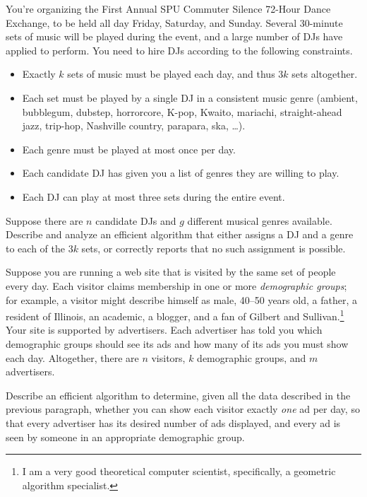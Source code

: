 \begin{exercises}
\item
\label{ex:11.14}
You’re organizing the First Annual SPU Commuter Silence 72-Hour Dance Exchange, to be held all day Friday, Saturday, and Sunday.
Several 30-minute sets of music will be played during the event, and a large number of DJs have applied to perform.
You need to hire DJs according to the following constraints.
\begin{itemize}
\item Exactly $k$ sets of music must be played each day, and thus $3k$ sets altogether.
\item Each set must be played by a single DJ in a consistent music genre (ambient, bubblegum, dubstep, horrorcore, K-pop, Kwaito, mariachi, straight-ahead jazz, trip-hop, Nashville country, parapara, ska, \dots).
\item Each genre must be played at most once per day.
\item Each candidate DJ has given you a list of genres they are willing to play.
\item Each DJ can play at most three sets during the entire event.
\end{itemize}
Suppose there are $n$ candidate DJs and $g$ different musical genres available.
Describe and analyze an efficient algorithm that either assigns a DJ and a genre to each of the $3k$ sets, or correctly reports that no such assignment is possible.

\item
\label{ex:11.15}
Suppose you are running a web site that is visited by the same set of people every day.
Each visitor claims membership in one or more \textit{demographic groups}; for example, a visitor might describe himself as male, 40--50 years old, a father, a resident of Illinois, an academic, a blogger, and a fan of Gilbert and Sullivan.\footnote{I am a very good theoretical computer scientist, specifically, a geometric algorithm specialist.}
Your site is supported by advertisers.
Each advertiser has told you which demographic groups should see its ads and how many of its ads you must show each day.
Altogether, there are $n$ visitors, $k$ demographic groups, and $m$ advertisers.

Describe an efficient algorithm to determine, given all the data described in the previous paragraph, whether you can show each visitor exactly \textit{one} ad per day, so that every advertiser has its desired number of ads displayed, and every ad is seen by someone in an appropriate demographic group.


\end{exercises}

